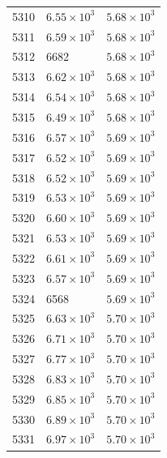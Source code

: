 \begin{table}[H]
\begin{tabular}{lll}
5310 & $\displaystyle 6.55 \times 10^{3}$ & $\displaystyle 5.68 \times 10^{3}$ \\
5311 & $\displaystyle 6.59 \times 10^{3}$ & $\displaystyle 5.68 \times 10^{3}$ \\
5312 & 6682 & $\displaystyle 5.68 \times 10^{3}$ \\
5313 & $\displaystyle 6.62 \times 10^{3}$ & $\displaystyle 5.68 \times 10^{3}$ \\
5314 & $\displaystyle 6.54 \times 10^{3}$ & $\displaystyle 5.68 \times 10^{3}$ \\
5315 & $\displaystyle 6.49 \times 10^{3}$ & $\displaystyle 5.68 \times 10^{3}$ \\
5316 & $\displaystyle 6.57 \times 10^{3}$ & $\displaystyle 5.69 \times 10^{3}$ \\
5317 & $\displaystyle 6.52 \times 10^{3}$ & $\displaystyle 5.69 \times 10^{3}$ \\
5318 & $\displaystyle 6.52 \times 10^{3}$ & $\displaystyle 5.69 \times 10^{3}$ \\
5319 & $\displaystyle 6.53 \times 10^{3}$ & $\displaystyle 5.69 \times 10^{3}$ \\
5320 & $\displaystyle 6.60 \times 10^{3}$ & $\displaystyle 5.69 \times 10^{3}$ \\
5321 & $\displaystyle 6.53 \times 10^{3}$ & $\displaystyle 5.69 \times 10^{3}$ \\
5322 & $\displaystyle 6.61 \times 10^{3}$ & $\displaystyle 5.69 \times 10^{3}$ \\
5323 & $\displaystyle 6.57 \times 10^{3}$ & $\displaystyle 5.69 \times 10^{3}$ \\
5324 & 6568 & $\displaystyle 5.69 \times 10^{3}$ \\
5325 & $\displaystyle 6.63 \times 10^{3}$ & $\displaystyle 5.70 \times 10^{3}$ \\
5326 & $\displaystyle 6.71 \times 10^{3}$ & $\displaystyle 5.70 \times 10^{3}$ \\
5327 & $\displaystyle 6.77 \times 10^{3}$ & $\displaystyle 5.70 \times 10^{3}$ \\
5328 & $\displaystyle 6.83 \times 10^{3}$ & $\displaystyle 5.70 \times 10^{3}$ \\
5329 & $\displaystyle 6.85 \times 10^{3}$ & $\displaystyle 5.70 \times 10^{3}$ \\
5330 & $\displaystyle 6.89 \times 10^{3}$ & $\displaystyle 5.70 \times 10^{3}$ \\
5331 & $\displaystyle 6.97 \times 10^{3}$ & $\displaystyle 5.70 \times 10^{3}$ \\

\end{tabular}
\end{table}
